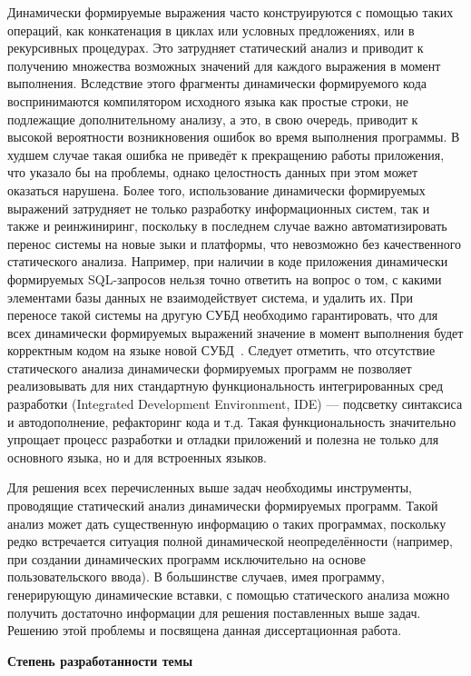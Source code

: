 Динамически формируемые выражения часто конструируются с помощью таких операций, как конкатенация в циклах или условных предложениях, или в рекурсивных процедурах. Это затрудняет статический анализ и приводит к получению множества возможных значений для каждого выражения в момент выполнения. Вследствие этого фрагменты динамически формируемого кода воспринимаются компилятором исходного языка как простые строки, не подлежащие дополнительному анализу, а это, в свою очередь, приводит к высокой вероятности возникновения ошибок во время выполнения программы. В худшем случае такая ошибка не приведёт к прекращению работы приложения, что указало бы на проблемы, однако целостность данных при этом может оказаться нарушена. Более того, использование динамически формируемых выражений затрудняет не только разработку информационных систем, так и также и реинжиниринг, поскольку в последнем случае важно автоматизировать перенос системы на новые зыки и платформы, что невозможно без качественного статического анализа. Например, при наличии в коде приложения динамически формируемых SQL-запросов нельзя точно ответить на вопрос о том, с какими элементами базы данных не взаимодействует система, и удалить их. При переносе такой системы на другую СУБД необходимо гарантировать, что для всех динамически формируемых выражений значение в момент выполнения будет корректным кодом на языке новой СУБД~\cite{JSquash}. Следует отметить, что отсутствие статического анализа динамически формируемых программ не позволяет реализовывать для них стандартную функциональность интегрированных сред разработки (Integrated Development Environment, IDE) --- подсветку синтаксиса и автодополнение, рефакторинг кода и т.д. Такая функциональность значительно упрощает процесс разработки и отладки приложений и полезна не только для основного языка, но и для встроенных языков. 

Для решения всех перечисленных выше задач необходимы инструменты, проводящие статический анализ динамически формируемых программ. Такой анализ может дать существенную информацию о таких программах, поскольку редко встречается ситуация полной динамической неопределённости (например, при создании динамических программ исключительно на основе пользовательского ввода). В большинстве случаев, имея программу, генерирующую динамические вставки, с помощью статического анализа можно получить достаточно информации для решения поставленных выше задач. Решению этой проблемы и посвящена данная диссертационная работа. 


\textbf{Степень разработанности темы}


